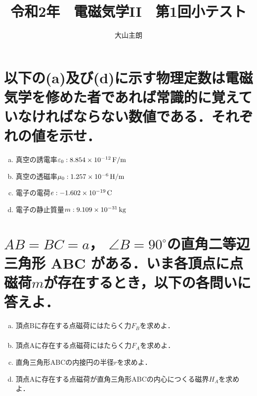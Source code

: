 \documentclass[dvipdfmx]{ujarticle}
\begin{document}
\title{令和2年　電磁気学II　第1回小テスト}
\date{}
\author{大山主朗}

\maketitle

\section{以下の(a)及び(d)に示す物理定数は電磁気学を修めた者であれば常識的に覚えていなければならない数値である．それぞれの値を示せ．}
\begin{enumerate}[(a)]
	\item 真空の誘電率$\varepsilon_{0}:8.854 \times 10^{-12}\,\rm{F/m}$
	\item 真空の透磁率$\mu_{0}:1.257 \times 10^{-6}\,\rm{H/m}$
	\item 電子の電荷$e:-1.602 \times 10^{-19}\,\rm{C}$
	\item 電子の静止質量$m:9.109\times 10^{-31}\,\rm{kg}$
\end{enumerate}

\section{$AB=BC=a$， $\angle B=90^{\circ}$の直角二等辺三角形 ABC がある．いま各頂点に点磁荷$m$が存在するとき，以下の各問いに答えよ．}
\begin{enumerate}[(a)]
	\item 頂点Bに存在する点磁荷にはたらく力$F_{B}$を求めよ．
	\begin{align*}
	\end{align*}
	\item 頂点Aに存在する点磁荷にはたらく力$F_{A}$を求めよ．
	\item 直角三角形ABCの内接円の半径$r$を求めよ．
	\item 頂点Aに存在する点磁荷が直角三角形ABCの内心につくる磁界$H_{A}$を求めよ．
\end{enumerate}
\end{document}

